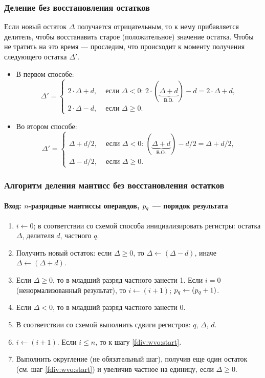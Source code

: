 \begin{frame}
    \frametitle{Деление без восстановления остатков}

    Если новый остаток $\Delta$ получается отрицательным, то к нему прибавляется делитель, чтобы восстанавить старое (положительное) значение остатка. Чтобы не тратить на это время --- проследим, что происходит к моменту получения следующего остатка $\Delta'$.
    
    \begin{itemize}
        \item В первом способе: 
        \[
            \Delta' = 
                \begin{cases}
                    2\cdot\Delta + d, & \text{ если $\Delta<0$: $2\cdot(\underbrace{\Delta + d}_\text{В.О.}) - d = 2\cdot\Delta + d$,}\\
                    2\cdot\Delta - d, & \text{ если $\Delta\ge 0$.}
                \end{cases}
        \]
        \item Во втором способе:
        \[
            \Delta' = 
                \begin{cases}
                    \Delta + d/2, & \text{ если $\Delta<0$: $(\underbrace{\Delta + d}_\text{В.О.}) - d/2 = \Delta + d/2$,}\\
                    \Delta - d/2, & \text{ если $\Delta\ge 0$.}
                \end{cases}
        \]
    \end{itemize}
\end{frame}

\begin{frame}
    \frametitle{Алгоритм деления мантисс без восстановления остатков}
    \framesubtitle{Вход: $n$-разрядные мантиссы операндов, $p_{q}$ --- порядок результата}
    
    \begin{enumerate}
        \item $i\gets 0$; в соответствии со схемой способа инициализировать регистры: остатка $\Delta$, делителя $d$, частного $q$.
        \item\label{fdiv:wvo:start} Получить новый остаток: если $\Delta\ge 0$, то $\Delta\gets(\Delta - d)$, иначе $\Delta\gets(\Delta + d)$.
        \item Если $\Delta \ge 0$, то в младший разряд частного занести 1. Если $i=0$ (ненормализованный результат), то $i\gets(i + 1)$; $p_{q}\gets(p_{q} + 1)$.
        \item Если $\Delta < 0$, то в младший разряд частного занести 0.
        \item В соответствии со схемой выполнить сдвиги регистров: $q$, $\Delta$, $d$.
        \item $i\gets (i + 1)$. Если $i\le n$, то к шагу \ref{fdiv:wvo:start}.
        \item Выполнить округление (не обязательный шаг), получив еще один остаток (см. шаг \ref{fdiv:wvo:start}) и увеличив частное на единицу, если $\Delta\ge 0$.
    \end{enumerate}
\end{frame}

